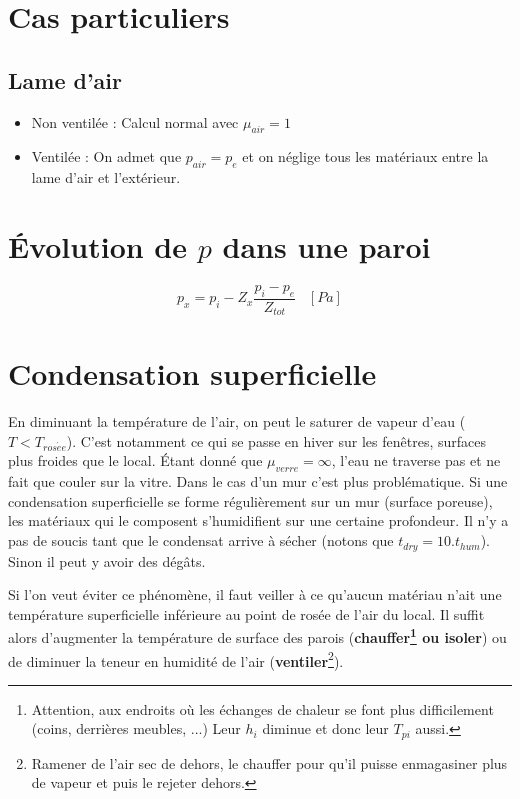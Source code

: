 \documentclass[11pt]{report}
\begin{document}
\section{Cas particuliers}
\subsection*{Lame d'air}
\begin{itemize}
\item Non ventilée : Calcul normal avec $\mu_{air}=1$
\item Ventilée : On admet que $p_{air}=p_e$ et on néglige tous les matériaux entre la lame d'air et l'extérieur.
\end{itemize}


\section{Évolution de $p$ dans une paroi}
$$p_x = p_i - Z_x \frac{p_i - p_e}{Z_{tot}}\;\;\;[Pa]$$



\section{Condensation superficielle}
En diminuant la température de l'air, on peut le saturer de vapeur d'eau ($T < T_{ros\acute{e}e}$). C'est notamment ce qui se passe en hiver  sur les fenêtres, surfaces plus froides que le local. Étant donné que $\mu_{verre}= \infty$, l'eau ne traverse pas et ne fait que couler sur la vitre. Dans le cas d'un mur c'est plus problématique. Si une condensation superficielle se forme régulièrement sur un mur (surface poreuse), les matériaux qui le composent s'humidifient sur une certaine profondeur. Il n'y a pas de soucis tant que le condensat arrive à sécher (notons que $t_{dry} = 10 . t_{hum}$). Sinon il peut y avoir des dégâts.

Si l'on veut éviter ce phénomène, il faut veiller à ce qu'aucun matériau n'ait une température superficielle inférieure au point de rosée de l'air du local. Il suffit alors d'augmenter la température de surface des parois (\textbf{chauffer\footnote{Attention, aux endroits où les échanges de chaleur se font plus difficilement (coins, derrières meubles, ...) Leur $h_i$ diminue et donc leur $T_{pi}$ aussi.} ou isoler}) ou de diminuer la teneur en humidité de l'air (\textbf{ventiler}\footnote{Ramener de l'air sec de dehors, le chauffer pour qu'il puisse enmagasiner plus de vapeur et puis le rejeter dehors.}).
\end{document}
